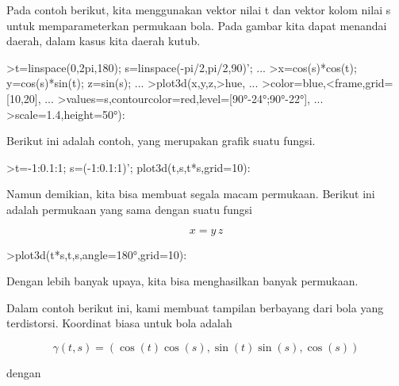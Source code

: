 \documentclass[12pt,arial,letterpaper]{book}
\begin{document}
\begin{eulernootebook}
\begin{eulercomment}
\begin{eulercomment}
\begin{eulernootebook}
\begin{eulercomment}
\begin{eulercomment}
\begin{eulercomment}
\begin{eulercomment}
\begin{eulercomment}
\begin{eulercomment}
\begin{eulercomment}
\begin{eulernotebook}
\begin{eulercomment}
Pada contoh berikut, kita menggunakan vektor nilai t dan vektor kolom
nilai s untuk memparameterkan permukaan bola. Pada gambar kita dapat
menandai daerah, dalam kasus kita daerah kutub.
\end{eulercomment}
\begin{eulerprompt}
>t=linspace(0,2pi,180); s=linspace(-pi/2,pi/2,90)'; ...
>x=cos(s)*cos(t); y=cos(s)*sin(t); z=sin(s); ...
>plot3d(x,y,z,>hue, ...
>color=blue,<frame,grid=[10,20], ...
>values=s,contourcolor=red,level=[90°-24°;90°-22°], ...
>scale=1.4,height=50°):
\end{eulerprompt}
\begin{eulercomment}
Berikut ini adalah contoh, yang merupakan grafik suatu fungsi.
\end{eulercomment}
\begin{eulerprompt}
>t=-1:0.1:1; s=(-1:0.1:1)'; plot3d(t,s,t*s,grid=10):
\end{eulerprompt}
\begin{eulercomment}
Namun demikian, kita bisa membuat segala macam permukaan. Berikut ini
adalah permukaan yang sama dengan suatu fungsi

\end{eulercomment}
\begin{eulerformula}
\[
x = y \, z
\]
\end{eulerformula}
\begin{eulerprompt}
>plot3d(t*s,t,s,angle=180°,grid=10):
\end{eulerprompt}
\begin{eulercomment}
Dengan lebih banyak upaya, kita bisa menghasilkan banyak permukaan.

Dalam contoh berikut ini, kami membuat tampilan berbayang dari bola
yang terdistorsi. Koordinat biasa untuk bola adalah

\end{eulercomment}
\begin{eulerformula}
\[
\gamma(t,s) = (\cos(t)\cos(s),\sin(t)\sin(s),\cos(s))
\]
\end{eulerformula}
\begin{eulercomment}
dengan


\end{eulercomment}
\end{eulernotebook}
\end{eulercomment}
\end{eulercomment}
\end{eulercomment}
\end{eulercomment}
\end{eulercomment}
\end{eulercomment}
\end{eulercomment}
\end{eulernootebook}
\end{eulercomment}
\end{eulercomment}
\end{eulernootebook}
\end{document}

